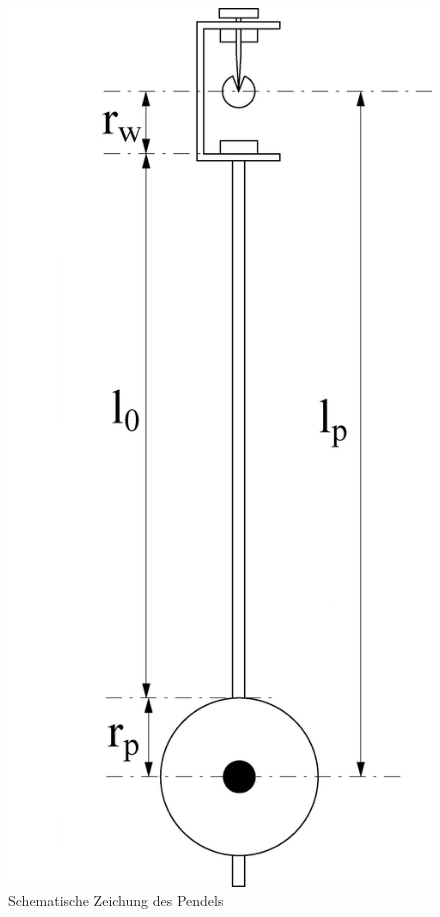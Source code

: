 \begin{figure}[h]
	\centering
	\includegraphics[scale=0.15]{bilder/Pendel_Zeichnung_be.jpg}
	\caption{Schematische Zeichung des Pendels}
\end{figure}

